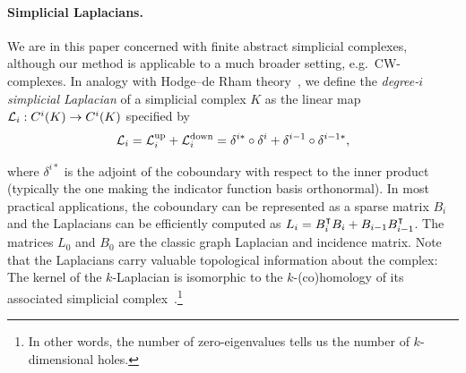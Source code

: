 \paragraph{Simplicial Laplacians.}
We are in this paper concerned with finite abstract simplicial complexes, although our method is applicable to a much broader setting, e.g.\ CW-complexes. In analogy with Hodge--de Rham theory~\cite{madsen1997calculus}, we define the \emph{degree-$i$ simplicial Laplacian} of a simplicial complex $K$ as the linear map $\mathcal{L}_i:C^i(K)\to C^i(K)$ specified by
\begin{equation*}
  \mathcal{L}_i = \mathcal{L}^{\text{up}}_i + \mathcal{L}^{\text{down}}_i = \delta^{i\ast}\circ\delta^{i} + \delta^{i-1}\circ\delta^{i-1\ast},
\end{equation*}

where $\delta^{i\ast}$ is the adjoint of the coboundary with respect to the inner product (typically the one making the indicator function basis orthonormal). In most practical applications, the coboundary can be represented as a sparse matrix $B_i$ and the Laplacians can be efficiently computed as $L_i=B_i^{\intercal} B_{i}+B_{i-1}B_{i-1}^{\intercal}$. The matrices $L_0$ and $B_0$ are the classic graph Laplacian and incidence matrix. Note that the Laplacians carry valuable topological information about the complex: The kernel of the $k$-Laplacian is isomorphic to the $k$-(co)homology of its associated simplicial complex~\cite{eckmann1944,horak2013spectra}.\footnote{In other words, the number of zero-eigenvalues tells us the number of $k$-dimensional holes.}
